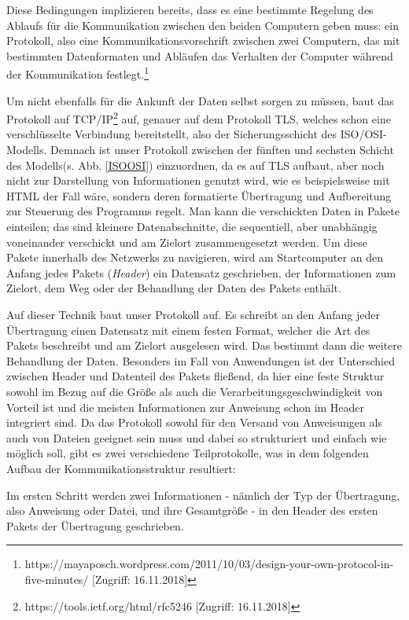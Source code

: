 Diese Bedingungen implizieren bereits, dass es eine bestimmte Regelung des Ablaufs für die Kommunikation zwischen den beiden Computern geben muss: ein Protokoll, also eine Kommunikationsvorschrift zwischen zwei Computern, das mit bestimmten Datenformaten und Abläufen das Verhalten der Computer während der Kommunikation festlegt.\footnote{https://mayaposch.wordpress.com/2011/10/03/design-your-own-protocol-in-five-minutes/ [Zugriff: 16.11.2018]}\par
Um nicht ebenfalls für die Ankunft der Daten selbst sorgen zu müssen, baut das Protokoll auf TCP/IP\footnote{https://tools.ietf.org/html/rfc5246 [Zugriff: 16.11.2018]} auf, genauer auf dem Protokoll TLS, welches schon eine verschlüsselte Verbindung bereitstellt, also der Sicherungsschicht des ISO/OSI-Modells. 
Demnach ist unser Protokoll zwischen der fünften und sechsten Schicht des Modells(s. Abb. \ref{ISOOSI}) einzuordnen, da es auf TLS aufbaut, aber noch nicht zur Darstellung von Informationen genutzt wird, wie es beispielsweise mit HTML der Fall wäre, sondern deren formatierte Übertragung und Aufbereitung zur Steuerung des Programms regelt.
Man kann die verschickten Daten in Pakete einteilen; das sind kleinere Datenabschnitte, die sequentiell, aber unabhängig voneinander verschickt und am Zielort zusammengesetzt werden.
Um diese Pakete innerhalb des Netzwerks zu navigieren, wird am Startcomputer an den Anfang jedes Pakets (\textit{Header}) ein Datensatz geschrieben, der Informationen zum Zielort, dem Weg oder der Behandlung der Daten des Pakets enthält.\\\par
Auf dieser Technik baut unser Protokoll auf. Es schreibt an den Anfang jeder Übertragung einen Datensatz mit einem festen Format, welcher die Art des Pakets beschreibt und am Zielort ausgelesen wird. Das bestimmt dann die weitere Behandlung der Daten.
Besonders im Fall von Anwendungen ist der Unterschied zwischen Header und Datenteil des Pakets fließend, da hier eine feste Struktur sowohl im Bezug auf die Größe als auch die Verarbeitungsgeschwindigkeit von Vorteil ist und die meisten Informationen zur Anweisung schon im Header integriert sind.
Da das Protokoll sowohl für den Versand von Anweisungen als auch von Dateien geeignet sein muss und dabei so strukturiert und einfach wie möglich soll, gibt es zwei verschiedene Teilprotokolle, was in dem folgenden Aufbau der Kommunikationsstruktur resultiert:\par
Im ersten Schritt werden zwei Informationen - nämlich der Typ der Übertragung, also Anweisung oder Datei, und ihre Gesamtgröße - in den Header des ersten Pakets der Übertragung geschrieben.\\
